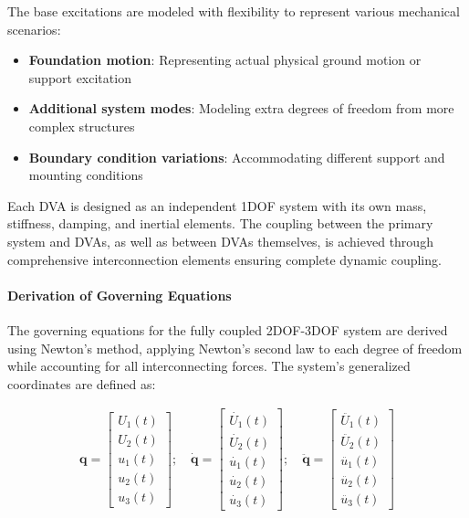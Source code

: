 \documentclass[12pt,a4paper]{article}
\begin{document}
The base excitations are modeled with flexibility to represent various mechanical scenarios:
\begin{itemize}
    \item \textbf{Foundation motion}: Representing actual physical ground motion or support excitation
    \item \textbf{Additional system modes}: Modeling extra degrees of freedom from more complex structures
    \item \textbf{Boundary condition variations}: Accommodating different support and mounting conditions
\end{itemize}

Each DVA is designed as an independent 1DOF system with its own mass, stiffness, damping, and inertial elements. The coupling between the primary system and DVAs, as well as between DVAs themselves, is achieved through comprehensive interconnection elements ensuring complete dynamic coupling.

\paragraph{Derivation of Governing Equations}

The governing equations for the fully coupled 2DOF-3DOF system are derived using Newton's method, applying Newton's second law to each degree of freedom while accounting for all interconnecting forces. The system's generalized coordinates are defined as:

\begin{align}\label{Eq.generalized.coordinate.2dof3dof}
    \mathbf{q} =
    \begin{bmatrix}
        U_1(t) \\
        U_2(t) \\
        u_1(t) \\
        u_2(t) \\
        u_3(t)
    \end{bmatrix}; \quad
    \dot{\mathbf{q}} =
    \begin{bmatrix}
        \dot{U_1}(t) \\
        \dot{U_2}(t) \\
        \dot{u_1}(t) \\
        \dot{u_2}(t) \\
        \dot{u_3}(t)
    \end{bmatrix}; \quad
    \ddot{\mathbf{q}} =
    \begin{bmatrix}
        \ddot{U_1}(t) \\
        \ddot{U_2}(t) \\
        \ddot{u_1}(t) \\
        \ddot{u_2}(t) \\
        \ddot{u_3}(t)
    \end{bmatrix}
\end{align}
\end{document}
